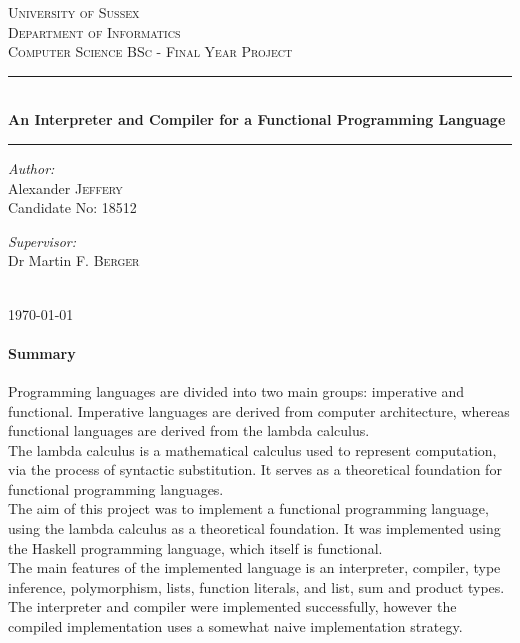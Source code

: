 \documentclass{article}
\begin{document}
\begin{titlepage}
    \center
    \textsc{\LARGE University of Sussex} \\
    \vspace{16mm}
    \textsc{\Large Department of Informatics} \\
    \vspace{4mm}
    \textsc{\large Computer Science BSc - Final Year Project} \\
    \vspace{8mm}
    \rule{\linewidth}{0.5mm}\\
    \vspace{2mm}
    {\huge \bfseries An Interpreter and Compiler for a Functional Programming Language}
    \rule{\linewidth}{0.5mm}
    \begin{minipage}{0.4\textwidth}
        \vspace{10mm}
        \begin{flushleft}
            \emph{Author:} \\
            Alexander \textsc{Jeffery} \\
            Candidate No: \textsc{18512}
        \end{flushleft}
    \end{minipage}
    \begin{minipage}{0.4\textwidth}
        \vspace{10mm}
        \begin{flushright}
            \emph{Supervisor:} \\
            Dr Martin F. \textsc{Berger}
        \end{flushright}
    \end{minipage} \\
    \vspace{10mm}
    {\large \today}
    \vfill
\end{titlepage}

\paragraph{Summary \\}
Programming languages are divided into two main groups: imperative and functional. Imperative languages are derived from computer architecture, whereas functional languages are derived from the lambda calculus.
\\\indent The lambda calculus is a mathematical calculus used to represent computation, via the process of syntactic substitution. It serves as a theoretical foundation for functional programming languages.
\\\indent The aim of this project was to implement a functional programming language, using the lambda calculus as a theoretical foundation. It was implemented using the Haskell programming language, which itself is functional.
\\\indent The main features of the implemented language is an interpreter, compiler, type inference, polymorphism, lists, function literals, and list, sum and product types.
\\\indent The interpreter and compiler were implemented successfully, however the compiled implementation uses a somewhat naive implementation strategy.
\pagebreak
\end{document}
